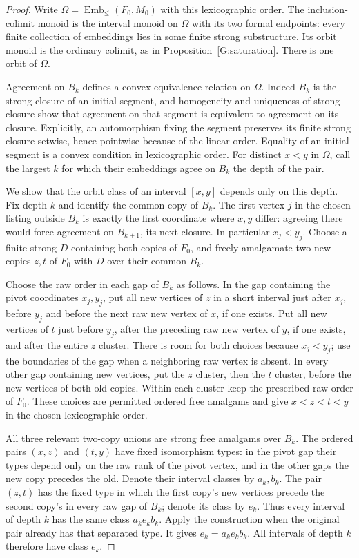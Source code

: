 \begin{proof}
Write $\Omega=\operatorname{Emb}_{\le}(F_0,M_0)$ with this
lexicographic order.  The inclusion-colimit monoid is the
interval monoid on $\Omega$ with its two formal endpoints:
every finite collection of embeddings lies in some finite
strong substructure.  Its orbit monoid is the ordinary
colimit, as in Proposition~\ref{G:saturation}.
There is one orbit of $\Omega$.

Agreement on $B_k$ defines a convex equivalence relation on
$\Omega$.  Indeed $B_k$ is the strong closure of an initial
segment, and homogeneity and uniqueness of strong closure
show that agreement on that segment is equivalent to agreement
on its closure.  Explicitly, an automorphism fixing the segment
preserves its finite strong closure setwise, hence pointwise
because of the linear order.
Equality of an initial segment is a convex
condition in lexicographic order.  For distinct $x<y$ in
$\Omega$, call the largest $k$ for which their embeddings
agree on $B_k$ the depth of the pair.

We show that the orbit class of an interval $[x,y]$ depends
only on this depth.  Fix depth $k$ and identify the common
copy of $B_k$.  The first vertex $j$ in the chosen listing
outside $B_k$
is exactly the first coordinate where $x,y$ differ: agreeing
there would force agreement on $B_{k+1}$, its next closure.
In particular $x_j<y_j$.  Choose a finite strong $D$ containing
both copies of $F_0$, and freely amalgamate two new copies
$z,t$ of $F_0$ with $D$ over their common $B_k$.

Choose the raw order in each gap of $B_k$ as follows.
In the gap containing the pivot coordinates $x_j,y_j$,
put all new vertices of $z$ in a short interval just after
$x_j$, before $y_j$ and before the next raw new vertex of
$x$, if one exists.  Put all new vertices of $t$ just before
$y_j$, after the preceding raw new vertex of $y$, if one
exists, and after the entire $z$ cluster.  There is room for
both choices because $x_j<y_j$; use the boundaries of the
gap when a neighboring raw vertex is absent.
In every other gap containing new vertices, put the $z$
cluster, then the $t$ cluster, before the new vertices of
both old copies.  Within each cluster keep the prescribed
raw order of $F_0$.
These choices are permitted ordered free amalgams and give
$x<z<t<y$ in the chosen lexicographic order.

All three relevant two-copy unions are strong free amalgams
over $B_k$.  The ordered pairs $(x,z)$ and $(t,y)$ have
fixed isomorphism types: in the pivot gap their types depend
only on the raw rank of the pivot vertex, and in the other
gaps the new copy precedes the old.  Denote their interval
classes by $a_k,b_k$.  The pair $(z,t)$ has the fixed type
in which the first copy's new vertices precede the second
copy's in every raw gap of $B_k$; denote its class by $e_k$.
Thus every interval of depth $k$ has the same class
$a_ke_kb_k$.
Apply the construction when the original pair already has
that separated type.  It gives $e_k=a_ke_kb_k$.
All intervals of depth $k$ therefore have class $e_k$.


\end{proof}
